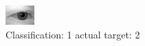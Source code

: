 \begin{figure}[h!]
\begin{center}
\includegraphics[width=0.60\columnwidth]{figures/ID495_class_1_target_2.png}
\end{center}
\caption{ Classification: 1 actual target: 2}
\label{fig:ID495_class_1_target_2}
\end{figure}
